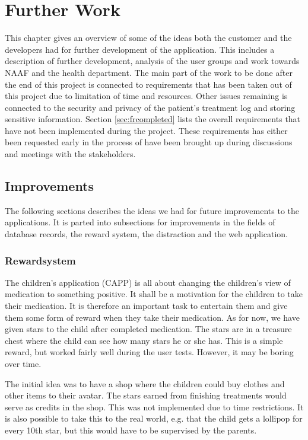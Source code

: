\chapter{Further Work}
\label{chap:furtherWork}
This chapter gives an overview of some of the ideas both the customer and the developers had for further development of the application. This includes a description of further development, analysis of the user groups and work towards NAAF and the health department.
The main part of the work to be done after the end of this project is connected to requirements that has been taken out of this project due to limitation of time and resources. Other issues remaining is connected to the security and privacy of the patient's treatment log and storing sensitive information.
Section \ref{sec:frcompleted} lists the overall requirements that have not been implemented during the project. These requirements has either been requested early in the process of have been brought up during discussions and meetings with the stakeholders. 


\section{Improvements}
\label{sec:Improvements}
The following sections describes the ideas we had for future improvements to the applications. It is parted into subsections for improvements in the fields of database records, the reward system, the distraction and the web application.




\subsection{Rewardsystem}
The children's application (CAPP) is all about changing the children's view of medication to something positive. It shall be a motivation for the children to take their medication. It is therefore an important task to entertain them and give them some form of reward when they take their medication. As for now, we have given stars to the child after completed medication. The stars are in a treasure chest where the child can see how many stars he or she has. This is a simple reward, but worked fairly well during the user tests. However, it may be boring over time. 

The initial idea was to have a shop where the children could buy clothes and other items to their avatar. The stars earned from finishing treatments would serve as credits in the shop. This was not implemented due to time restrictions. It is also possible to take this to the real world, e.g. that the child gets a lollipop for every 10th star, but this would have to be supervised by the parents. 
 


